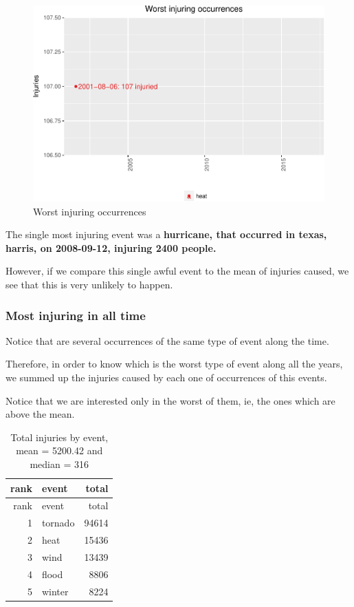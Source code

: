\documentclass[]{article}
\begin{document}
\begin{figure}[htbp]
\centering
\includegraphics{readme_files/figure-latex/injuring-single-plot-1.pdf}
\caption{Worst injuring occurrences}
\end{figure}

The single most injuring event was a \textbf{hurricane, that occurred in
texas, harris, on 2008-09-12, injuring 2400 people.}

However, if we compare this single awful event to the mean of injuries
caused, we see that this is very unlikely to happen.

\subsubsection{Most injuring in all
time}\label{most-injuring-in-all-time}

Notice that are several occurrences of the same type of event along the
time.

Therefore, in order to know which is the worst type of event along all
the years, we summed up the injuries caused by each one of occurrences
of this events.

Notice that we are interested only in the worst of them, ie, the ones
which are above the mean.

\begin{longtable}[]{@{}rlr@{}}
\caption{Total injuries by event, mean = 5200.42 and median =
316}\tabularnewline
\toprule
rank & event & total\tabularnewline
\midrule
\endfirsthead
\toprule
rank & event & total\tabularnewline
\midrule
\endhead
1 & tornado & 94614\tabularnewline
2 & heat & 15436\tabularnewline
3 & wind & 13439\tabularnewline
4 & flood & 8806\tabularnewline
5 & winter & 8224\tabularnewline
\bottomrule
\end{longtable}
\end{document}
